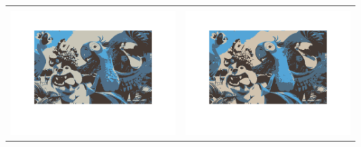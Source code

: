 \documentclass[fleqn]{article}
\begin{document}
\begin{center}
  \begin{longtable}{ c | c }
	\multicolumn{1}{c}{} & 
	\multicolumn{1}{c}{}  \\
	\includegraphics[scale=0.4]{./pics/task1and2/rio_k=4_random/K=4_iteration_1_random_4_rio.png} & \includegraphics[scale=0.4]{./pics/task1and2/rio_k=4_random/K=4_iteration_2_random_4_rio.png} \\\hline

\end{longtable}
\end{center}
\end{document}
